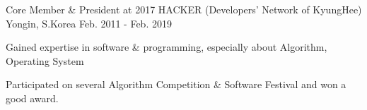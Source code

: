 

\begin{cventries}

  \cventry
    {Core Member \& President at 2017} %
    {HACKER (Developers' Network of KyungHee)} %
    {Yongin, S.Korea} %
    {Feb. 2011 - Feb. 2019} %
    {
      \begin{cvitems} %
        \item {Gained expertise in software \& programming, especially about Algorithm, Operating System}
        \item {Participated on several Algorithm Competition \& Software Festival and won a good award.}
      \end{cvitems}
    }

\end{cventries}
